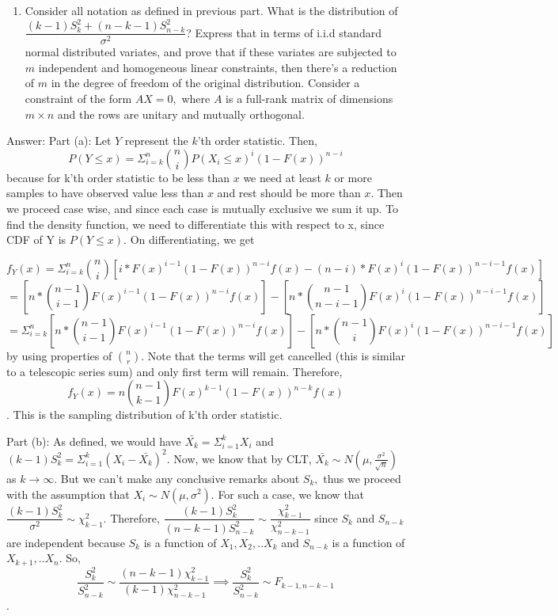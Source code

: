 \documentclass[12pt, oneside]{article}
\begin{document}
\begin{enumerate}
\begin{enumerate}
    \item Consider all notation as defined in previous part. What is the distribution of
    \newline $\dfrac{(k-1)S_k^2 + (n-k-1)S_{n-k}^2}{\sigma^2}$? Express that in terms of i.i.d standard normal distributed variates, and prove that if these variates are subjected to $m$ independent and homogeneous linear constraints, then there's a reduction of $m$ in the degree of freedom of the original distribution. Consider a constraint of the form $AX=0,$ where $A$ is a full-rank matrix of dimensions $m \times n$ and the rows are unitary and mutually orthogonal.

\end{enumerate}
Answer:
\newline Part (a): 
Let $Y$ represent the $k$'th order statistic. Then, 
$$P(Y \le x) = \Sigma_{i=k}^{n} {n \choose i} P(X_i \le x)^{i}(1-F(x))^{n-i}$$
because for k'th order statistic to be less than $x$ we need at least $k$ or more samples to have observed value less than $x$ and rest should be more than $x$. Then we proceed case wise, and since each case is mutually exclusive we sum it up. 
To find the density function, we need to differentiate this with respect to x, since CDF of Y is $P(Y \le x)$. On differentiating, we get

$$f_Y(x) = \Sigma_{i=k}^{n} {n \choose i} [i*F(x)^{i-1}(1-F(x))^{n-i}f(x) - (n-i)*F(x)^{i}(1-F(x))^{n-i-1}f(x)]$$
$$ = [n*{n-1 \choose i-1}F(x)^{i-1}(1-F(x))^{n-i}f(x)] - [n*{n-1 \choose n-i-1}F(x)^{i}(1-F(x))^{n-i-1}f(x)]$$
$$ = \Sigma_{i=k}^{n} [n*{n-1 \choose i-1}F(x)^{i-1}(1-F(x))^{n-i}f(x)] - [n*{n-1 \choose i}F(x)^{i}(1-F(x))^{n-i-1}f(x)]$$
by using properties of $n \choose r$. Note that the terms will get cancelled (this is similar to a telescopic series sum) and only first term will remain. Therefore, 
$$f_Y(x) = n {n-1 \choose k-1} F(x)^{k-1} (1-F(x))^{n-k} f(x)$$. This is the sampling distribution of k'th order statistic. 

 Part (b): As defined, we would have $\bar{X_k} = \Sigma_{i=1}^{k} X_i$ and $(k-1)S_k^2 = \Sigma_{i=1}^{k} (X_i-\bar{X_k})^2$. 
Now, we know that by CLT, $\bar{X_k} \sim N(\mu,\frac{\sigma^2}{\sqrt{n}})$ as $k \to \infty$. But we can't make any conclusive remarks about $S_k,$ thus we proceed with the assumption that $X_i \sim N(\mu,\sigma^2)$. For such a case, we know that $\dfrac{(k-1)S_k^2}{\sigma^2} \sim \chi_{k-1}^2$. Therefore, $\dfrac{(k-1)S_k^2}{(n-k-1)S_{n-k}^2} \sim \dfrac{\chi_{k-1}^2}{\chi_{n-k-1}^2}$ since $S_k$ and $S_{n-k}$ are independent because $S_k$ is a function of $X_1,X_2,..X_k$ and $S_{n-k}$ is a function of $X_{k+1},..X_n$. 
So, 
$$\dfrac{S_k^2}{S_{n-k}^2} \sim \dfrac{(n-k-1)\chi_{k-1}^2}{(k-1)\chi_{n-k-1}^2} \implies \dfrac{S_k^2}{S_{n-k}^2} \sim F_{k-1,n-k-1}$$. 


\end{enumerate}
\end{document}
